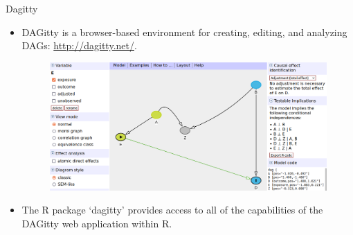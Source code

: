 \documentclass[handout]{beamer}
\begin{document}
\begin{frame}{Dagitty}
\scriptsize{
\begin{itemize}



\item DAGitty is a browser-based environment for creating, editing, and analyzing DAGs: \url{http://dagitty.net/}.

\begin{figure}[h!]
	\centering
	\includegraphics[scale=0.2]{pics/DAGitty.png}
	\end{figure} 



\item The R package ‘dagitty’ provides access to all of the capabilities of the DAGitty web application within R.


\end{itemize}





} 

\end{frame}
\end{document}
